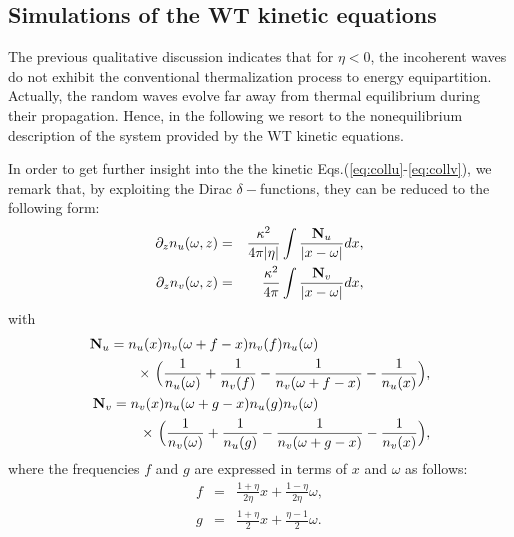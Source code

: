 \documentclass[pra,twocolumn,showpacs,preprintnumbers,amsmath,amssymb]{revtex4}
\begin{document}
\subsection{Simulations of the WT kinetic equations}

The previous qualitative discussion indicates that for $\eta < 0$, the incoherent waves do not exhibit the conventional thermalization process to energy equipartition. Actually, the random waves evolve far away from thermal equilibrium during their propagation.
Hence, in the following we resort to the nonequilibrium description of the system provided by the WT kinetic equations.

In order to get further insight into the the kinetic Eqs.(\ref{eq:collu}-\ref{eq:collv}), we remark that, by exploiting the Dirac $\delta-$functions, they can be reduced to the following form:
\begin{eqnarray}
 \partial_z n_u(\omega,z) &=& \frac{\kappa^2}{4 \pi |\eta| }  \int \frac{{\bf N}_u}{|x -\omega|}   dx,
\label{eq:kinetic_u2} \\
 \partial_z n_v(\omega,z) &=& \frac{\kappa^2}{4 \pi} \int \frac{{\bf N}_v}{|x -\omega|}    dx,
\label{eq:kinetic_v2}
\end{eqnarray}
with 
\begin{eqnarray}
{\bf N}_u = n_u(x) n_v(\omega+f-x) n_v(f) n_u(\omega) \quad \quad  \quad \quad  \quad \quad  \quad \quad   \nonumber \\
\quad \quad \quad   \times \ \Big( \frac {1}{n_u(\omega)} + \frac {1}{n_v(f)} - \frac {1}{n_v(\omega+f-x)} - \frac {1}{n_u(x)} \Big), \\
{\bf N}_v = n_v(x) n_u(\omega+g-x) n_u(g) n_v(\omega) \quad \quad  \quad \quad  \quad \quad  \quad \quad   \nonumber \\
\quad \quad \quad  \times \ \Big( \frac {1}{n_v(\omega)} + \frac {1}{n_u(g)} - \frac {1}{n_v(\omega+g-x)} - \frac {1}{n_v(x)} \Big), 
\end{eqnarray}
where the frequencies $f$ and $g$ are expressed in terms of $x$ and $\omega$ as follows:
\begin{eqnarray}
f &=& \frac{1+\eta}{2 \eta} x + \frac{1-\eta}{2 \eta} \omega, 
\label{eq:phasematch_kin1}\\
g &=& \frac{1+\eta}{2} x + \frac{\eta-1}{2} \omega.
\label{eq:phasematch_kin2}
\end{eqnarray}
\end{document}
